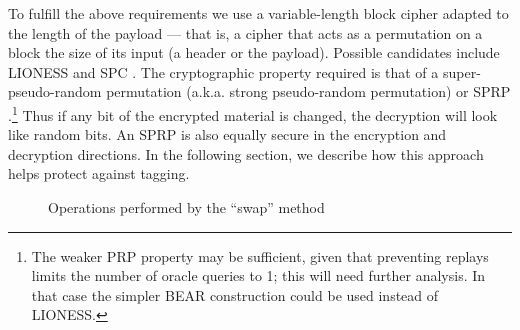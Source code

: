 \documentclass[11pt]{IEEEtran}
\begin{document}
To fulfill the above requirements we use a variable-length block
cipher adapted to the length of the payload --- that
is, a cipher that acts as a permutation on a block the size of its
input (a header or the payload).  Possible candidates
include LIONESS \cite{BEAR-LIONESS} and SPC \cite{SPC}.
The cryptographic property required is that of a super-pseudo-random
permutation (a.k.a. strong pseudo-random permutation) or SPRP \cite{sprp}.\footnote{
The weaker PRP property may be sufficient, given that preventing
replays limits the number of oracle queries to 1; this will need
further analysis.  In that case the simpler BEAR construction
\cite{BEAR-LIONESS} could be used instead of LIONESS.}
Thus if any bit of
the encrypted material is changed, the decryption will look like random
bits.  An SPRP is also equally secure in the encryption and decryption
directions.  In the following section, we describe
how this approach helps protect against tagging.


%

\begin{figure}
\begin{center}
\caption{Operations performed by the ``swap'' method} 
\end{center}
\end{figure}
\end{document}

